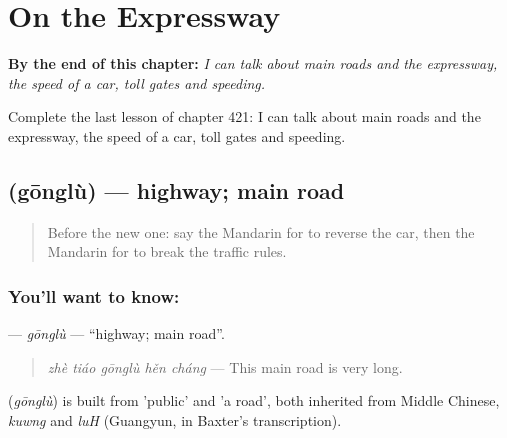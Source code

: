 
\chapter{On the Expressway}
\label{ch:zh-on-the-expressway}

\begin{chapteropening}
\textbf{By the end of this chapter:} \emph{I can talk about main roads and the expressway, the speed of a car, toll gates and speeding.}

Complete the last lesson of chapter 421: I can talk about main roads and the expressway, the speed of a car, toll gates and speeding.
\end{chapteropening}

\section[\texorpdfstring{\zh{公路} (gōnglù)}{公路 (gōnglù)}]{ (gōnglù) — highway; main road}

\label{lesson:ZH-C421-gonglu}



\begin{quote}
Before the new one: say the Mandarin for to reverse the car, then the Mandarin for to break the traffic rules.
\end{quote}

\subsection*{You'll want to know: }
\textbf{} — \emph{gōnglù} — \textquotedblleft{}highway; main road\textquotedblright{}.

\begin{quote}
\emph{zhè tiáo gōnglù hěn cháng} — This main road is very long.
\end{quote}

\begin{cousinweb}
\textbf{} (\emph{gōnglù}) is built from  'public' and  'a road', both inherited from Middle Chinese, \emph{kuwng} and \emph{luH} (Guangyun, in Baxter's transcription).
\end{cousinweb}

